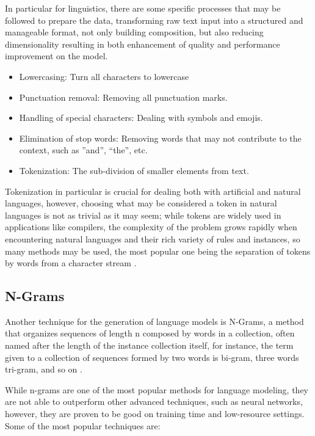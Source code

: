 In particular for linguistics, there are some specific processes that may be followed to prepare the data, transforming raw text input into a structured and manageable format, not only building composition, but also reducing dimensionality resulting in both enhancement of quality and performance improvement on the model.

\begin{itemize}
    \item Lowercasing: Turn all characters to lowercase
    \item Punctuation removal: Removing all punctuation marks.
    \item Handling of special characters: Dealing with symbols and emojis.
    \item Elimination of stop words: Removing words that may not contribute to the context, such as ”and”, “the”, etc.
    \item Tokenization: The sub-division of smaller elements from text.
\end{itemize}

Tokenization in particular is crucial for dealing both with artificial and natural languages, however, choosing what may be considered a token in natural languages is not as trivial as it may seem; while tokens are widely used in applications like compilers, the complexity of the problem grows rapidly when encountering natural languages and their rich variety of rules and instances, so many methods may be used, the most popular one being the separation of tokens by words from a character stream \cite{grefenstette1994}.

\subsection{N-Grams}

Another technique for the generation of language models is N-Grams, a method that organizes sequences of length n composed by words in a collection, often named after the length of the instance collection itself, for instance, the term given to a collection of sequences formed by two words is bi-gram, three words tri-gram, and so on \cite{brill1998}.

While n-grams are one of the most popular methods for language modeling, they are not able to outperform other advanced techniques, such as neural networks, however, they are proven to be good on training time and low-resource settings. Some of the most popular techniques are:

